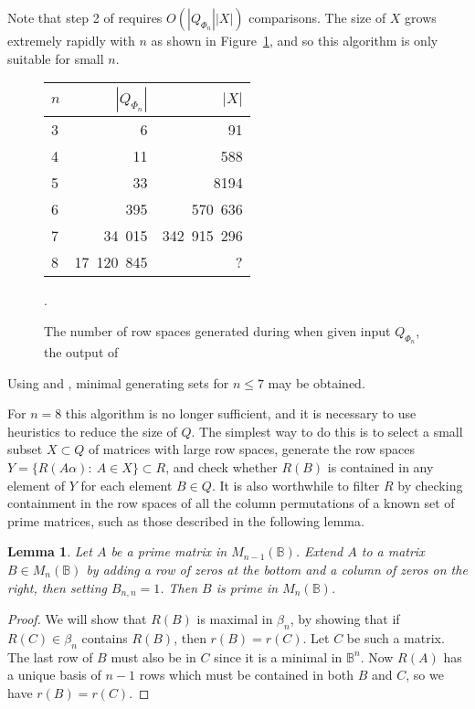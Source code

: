 \documentclass[11pt]{article}
\newtheorem{lemma}[thm]{Lemma}
\numberwithin{equation}{section}
\newcommand{\B}{\mathbb{B}}
\newcommand{\Bn}{M_n(\B)}
\begin{document}
Note that step 2 of  requires $O(|Q_{\Phi_n}||X|)$ comparisons.  The
size of $X$ grows extremely rapidly with $n$ as shown in
Figure~\ref{fig:filter1numbers}, and so this algorithm is only suitable for small $n$.
\begin{figure}
  \centering
  \begin{tabular}{l|r|r}
    $n$ & $|Q_{\Phi_n}|$ & $|X|$ \\
    \hline
    3 & 6 & 91 \\ 
    4 & 11 & 588 \\
    5 & 33 & 8194 \\
    6 & 395 & 570\ 636 \\ 
    7 & 34\ 015 & 342\ 915\ 296 \\
    8 & 17\ 120\ 845 & ? 
  \end{tabular}
\vspace{1cm}

\caption{The number of row spaces generated during  when
  given input $Q_{\Phi_n}$, the output of }. 
  \label{fig:filter1numbers}
\end{figure}

Using  and , minimal
generating sets for $n \leq 7$ may be obtained.

For $n=8$ this algorithm is no longer sufficient, and it is necessary to use
heuristics to reduce the size of $Q$. The simplest way to do this is to select a
small subset $X \subset Q$ of matrices with large row spaces, generate the row
spaces $Y = \{R(A\alpha) :\: A \in X\} \subset R$, and check whether $R(B)$ is
contained in any element of $Y$ for each element $B \in Q$.  It is also
worthwhile to filter $R$ by checking containment in the row spaces of all the
column permutations of a known set of prime matrices, such as those described in
the following lemma.

\begin{lemma}
  Let $A$ be a prime matrix in $M_{n-1}(\B)$. Extend $A$ to a matrix $B \in \Bn$
  by adding a row of zeros at the bottom and a column of zeros on the right,
  then setting $B_{n,n} = 1$. Then $B$ is prime in $\Bn$.
\end{lemma}
\begin{proof}
  We will show that $R(B)$ is maximal in $\beta_n$, by showing that if 
  $R(C) \in \beta_n$ contains $R(B)$, then $r(B) = r(C)$.
  Let $C$ be such a matrix.
  The last row of $B$ must also be in $C$ since it is a minimal in $\B^{n}$. 
  Now $R(A)$ has a unique basis of $n-1$ rows which must be contained in both $B$ and
  $C$, so we have $r(B) = r(C)$.
\end{proof}
\end{document}
